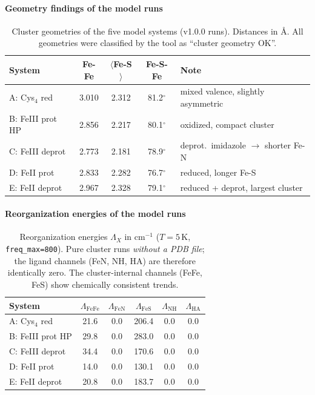 \documentclass[11pt,a4paper,twoside]{article}
\providecommand{\angstrom}{\text{\AA}}    %
\theoremstyle{remark}
\begin{document}
\paragraph{Geometry findings of the model runs}

\begin{table}[h]
\centering
\small
\begin{tabular}{|l|c|c|c|l|}
\hline
\textbf{System} & \textbf{Fe-Fe} & \textbf{$\langle$Fe-S$\rangle$} &
  \textbf{Fe-S-Fe} & \textbf{Note} \\
\hline
A: Cys$_4$ red    & 3.010 & 2.312 & 81.2$^{\circ}$ & mixed valence, slightly asymmetric \\
B: FeIII prot HP  & 2.856 & 2.217 & 80.1$^{\circ}$ & oxidized, compact cluster \\
C: FeIII deprot   & 2.773 & 2.181 & 78.9$^{\circ}$ & deprot.\ imidazole $\to$ shorter Fe-N \\
D: FeII prot      & 2.833 & 2.282 & 76.7$^{\circ}$ & reduced, longer Fe-S \\
E: FeII deprot    & 2.967 & 2.328 & 79.1$^{\circ}$ & reduced + deprot, largest cluster \\
\hline
\end{tabular}
\caption{Cluster geometries of the five model systems (v1.0.0
runs). Distances in $\angstrom$. All geometries were classified by
the tool as ``cluster geometry OK''.}
\label{tab:val-geometrie}
\end{table}

\paragraph{Reorganization energies of the model runs}

\begin{table}[h]
\centering
\small
\begin{tabular}{|l|c|c|c|c|c|}
\hline
\textbf{System} & $\Lambda_\text{FeFe}$ & $\Lambda_\text{FeN}$ &
  $\Lambda_\text{FeS}$ & $\Lambda_\text{NH}$ & $\Lambda_\text{HA}$ \\
\hline
A: Cys$_4$ red       & 21.6 & 0.0 & 206.4 & 0.0 & 0.0 \\
B: FeIII prot HP   & 29.8 & 0.0 & 283.0 & 0.0 & 0.0 \\
C: FeIII deprot      & 34.4 & 0.0 & 170.6 & 0.0 & 0.0 \\
D: FeII prot         & 14.0 & 0.0 & 130.1 & 0.0 & 0.0 \\
E: FeII deprot       & 20.8 & 0.0 & 183.7 & 0.0 & 0.0 \\
\hline
\end{tabular}
\caption{Reorganization energies $\Lambda_X$ in cm$^{-1}$
($T=5$\,K, \texttt{freq\_max=800}). Pure cluster runs
\emph{without a PDB file}; the ligand channels (FeN, NH, HA) are
therefore identically zero. The cluster-internal channels (FeFe,
FeS) show chemically consistent trends.}
\label{tab:val-reorg-modell}
\end{table}
\end{document}
